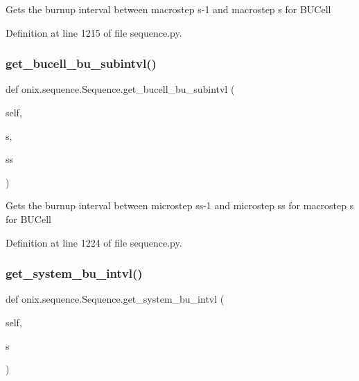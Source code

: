 \begin{DoxyVerb}Gets the burnup interval between macrostep s-1 and macrostep s for BUCell\end{DoxyVerb}
 

Definition at line 1215 of file sequence.\+py.

\mbox{\label{classonix_1_1sequence_1_1Sequence_a6732fe610abc6a483d990857c9be7e92}} 
\subsubsection{\texorpdfstring{get\+\_\+bucell\+\_\+bu\+\_\+subintvl()}{get\_bucell\_bu\_subintvl()}}
{\footnotesize\ttfamily def onix.\+sequence.\+Sequence.\+get\+\_\+bucell\+\_\+bu\+\_\+subintvl (\begin{DoxyParamCaption}\item[{}]{self,  }\item[{}]{s,  }\item[{}]{ss }\end{DoxyParamCaption})}

\begin{DoxyVerb}Gets the burnup interval between microstep ss-1 and microstep ss for macrostep s for BUCell\end{DoxyVerb}
 

Definition at line 1224 of file sequence.\+py.

\mbox{\label{classonix_1_1sequence_1_1Sequence_a99650e5369f6b233da5086cb551dc25c}} 
\subsubsection{\texorpdfstring{get\+\_\+system\+\_\+bu\+\_\+intvl()}{get\_system\_bu\_intvl()}}
{\footnotesize\ttfamily def onix.\+sequence.\+Sequence.\+get\+\_\+system\+\_\+bu\+\_\+intvl (\begin{DoxyParamCaption}\item[{}]{self,  }\item[{}]{s }\end{DoxyParamCaption})}

